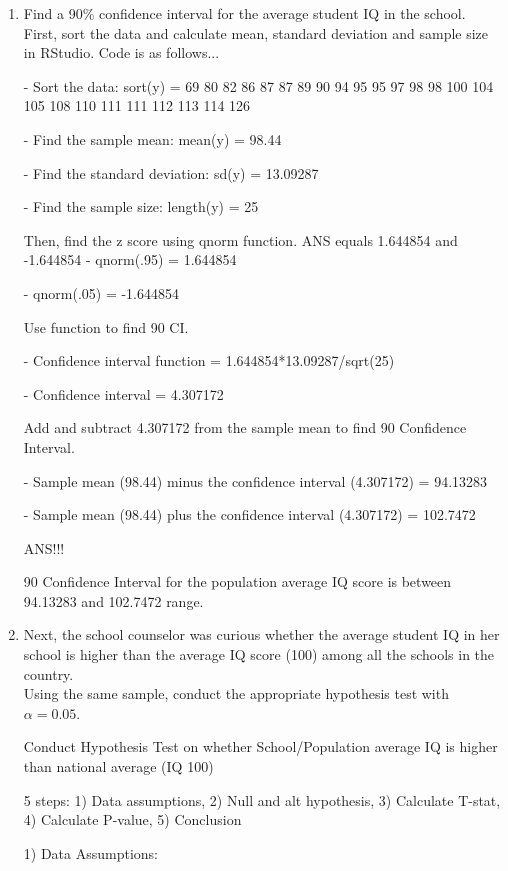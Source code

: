 \documentclass[12pt,letterpaper]{article}
\begin{document}
\begin{enumerate}
	\item Find a 90\% confidence interval for the average student IQ in the school.\\

 First, sort the data and calculate mean, standard deviation and sample size in RStudio.
	Code is as follows...
	
	- Sort the data: sort(y) = 69  80  82  86  87  87  89  90  94  95  95  97  98  98 100 104 105 108 110 111 111 112 113 114 126

	 - Find the sample mean: mean(y) = 98.44
	
	- Find the standard deviation: sd(y) = 13.09287
	
	 - Find the sample size: length(y) = 25
	
Then, find the z score using qnorm function. ANS equals 1.644854 and -1.644854
	- qnorm(.95) = 1.644854
	
	- qnorm(.05) = -1.644854

Use function to find 90 CI. 
	
	- Confidence interval function = 1.644854*13.09287/sqrt(25)
	
	- Confidence interval = 4.307172

Add and subtract 4.307172 from the sample mean to find 90 Confidence Interval.
	
	- Sample mean (98.44) minus the confidence interval (4.307172) = 94.13283
	
	- Sample mean (98.44) plus the confidence interval (4.307172) = 102.7472

	ANS!!!    
	
	90 Confidence Interval  for the population average IQ score is between 94.13283 and 102.7472 range. 
	 
	\item Next, the school counselor was curious  whether  the average student IQ in her school is higher than the average IQ score (100) among all the schools in the country.\\ 
	
	\noindent Using the same sample, conduct the appropriate hypothesis test with $\alpha=0.05$.
	
	Conduct Hypothesis Test on whether School/Population average IQ is higher than national average (IQ 100)
	
	 5 steps: 1) Data assumptions, 2) Null and alt hypothesis, 3) Calculate T-stat, 4) Calculate P-value, 5) Conclusion
	
	 1) Data Assumptions: 
	 

\end{enumerate}
\end{document}
